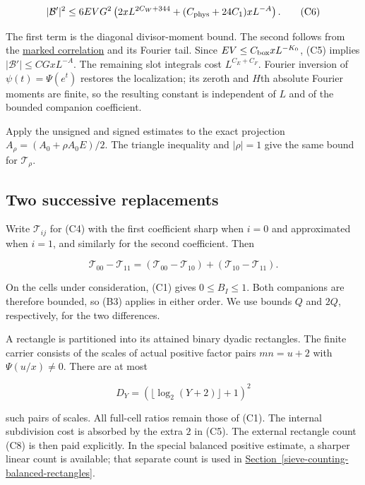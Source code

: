 \[
|\mathcal B'|^2\le6EVG^2
 \left(2xL^{2C_W+344}+(C_{\rm phys}+24C_1)xL^{-A}\right). \tag{C6}
\]

The first term is the diagonal divisor-moment bound. The second follows
from the \protect\hyperlink{marked-correlation}{marked correlation} and
its Fourier tail. Since \(EV\le C_{\rm box}xL^{-K_0}\), (C5) implies
\(|\mathcal B'|\le CGxL^{-A}\). The remaining slot integrals cost
\(L^{C_E+C_F}\). Fourier inversion of \(\psi(t)=\Psi(e^t)\) restores the
localization; its zeroth and \(H\)th absolute Fourier moments are
finite, so the resulting constant is independent of \(L\) and of the
bounded companion coefficient.

Apply the unsigned and signed estimates to the exact projection
\(A_\rho=(A_0+\rho A_0E)/2\). The triangle inequality and \(|\rho|=1\)
give the same bound for \(\mathcal T_\rho\).


\hypertarget{correlation-two-successive-replacements}{%
\subsection{Two successive
replacements}\label{correlation-two-successive-replacements}}

Write \(\mathcal T_{ij}\) for (C4) with the first coefficient sharp when
\(i=0\) and approximated when \(i=1\), and similarly for the second
coefficient. Then

\[
\mathcal T_{00}-\mathcal T_{11}
=(\mathcal T_{00}-\mathcal T_{10})
 +(\mathcal T_{10}-\mathcal T_{11}). \tag{C7}
\]

On the cells under consideration, (C1) gives \(0\le B_I\le1\). Both
companions are therefore bounded, so (B3) applies in either order. We
use bounds \(Q\) and \(2Q\), respectively, for the two differences.

A rectangle is partitioned into its attained binary dyadic rectangles.
The finite carrier consists of the scales of actual positive factor
pairs \(mn=u+2\) with \(\Psi(u/x)\ne0\). There are at most

\[
D_Y=(\lfloor\log_2(Y+2)\rfloor+1)^2 \tag{C8}
\]

such pairs of scales. All full-cell ratios remain those of (C1). The
internal subdivision cost is absorbed by the extra \(2\) in (C5). The
external rectangle count (C8) is then paid explicitly. In the special
balanced positive estimate, a sharper linear count is available; that
separate count is used in
\protect\hyperlink{sieve-counting-balanced-rectangles}{Section~\ref{sieve-counting-balanced-rectangles}}.

